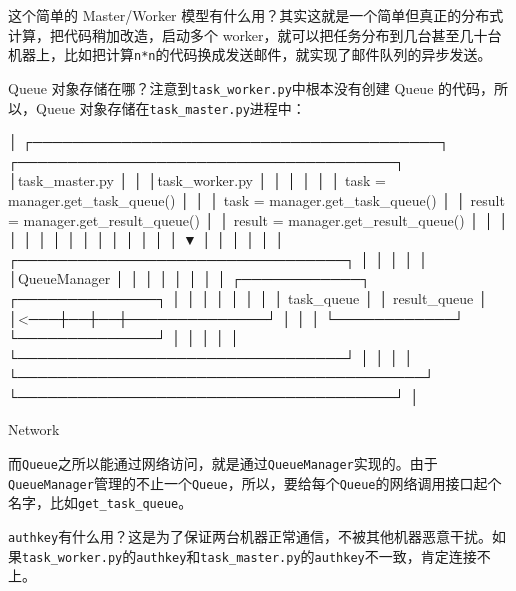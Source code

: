 这个简单的 Master/Worker
模型有什么用？其实这就是一个简单但真正的分布式计算，把代码稍加改造，启动多个
worker，就可以把任务分布到几台甚至几十台机器上，比如把计算\texttt{n*n}的代码换成发送邮件，就实现了邮件队列的异步发送。

Queue 对象存储在哪？注意到\texttt{task\_worker.py}中根本没有创建 Queue
的代码，所以，Queue 对象存储在\texttt{task\_master.py}进程中：

\newpage
\begin{textcode}
                                             │
┌─────────────────────────────────────────┐     ┌──────────────────────────────────────┐
│task_master.py                           │  │  │task_worker.py                        │
│                                         │     │                                      │
│  task = manager.get_task_queue()        │  │  │  task = manager.get_task_queue()     │
│  result = manager.get_result_queue()    │     │  result = manager.get_result_queue() │
│              │                          │  │  │              │                       │
│              │                          │     │              │                       │
│              ▼                          │  │  │              │                       │
│  ┌─────────────────────────────────┐    │     │              │                       │
│  │QueueManager                     │    │  │  │              │                       │
│  │ ┌────────────┐ ┌──────────────┐ │    │     │              │                       │
│  │ │ task_queue │ │ result_queue │ │<───┼──┼──┼──────────────┘                       │
│  │ └────────────┘ └──────────────┘ │    │     │                                      │
│  └─────────────────────────────────┘    │  │  │                                      │
└─────────────────────────────────────────┘     └──────────────────────────────────────┘
                                             │

                                          Network
\end{textcode}

而\texttt{Queue}之所以能通过网络访问，就是通过\texttt{QueueManager}实现的。由于\texttt{QueueManager}管理的不止一个\texttt{Queue}，所以，要给每个\texttt{Queue}的网络调用接口起个名字，比如\texttt{get\_task\_queue}。

\texttt{authkey}有什么用？这是为了保证两台机器正常通信，不被其他机器恶意干扰。如果\texttt{task\_worker.py}的\texttt{authkey}和\texttt{task\_master.py}的\texttt{authkey}不一致，肯定连接不上。

